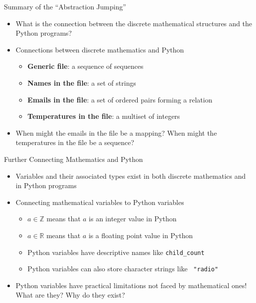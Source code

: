 \documentclass[14pt,aspectratio=169]{beamer}
\begin{document}
%
\begin{frame}{Summary of the ``Abstraction Jumping''}
  \begin{itemize}
    \item What is the connection between the discrete mathematical structures
      and the Python programs?
      \vspace*{-.15in}
    \item Connections between discrete mathematics and Python
      \begin{itemize}
        \item {\bf Generic file}: a sequence of sequences
        \item {\bf Names in the file}: a set of strings
        \item {\bf Emails in the file}: a set of ordered pairs forming a
          relation
        \item {\bf Temperatures in the file}: a multiset of integers
      \end{itemize}
      \vspace*{-.2in}
    \item When might the emails in the file be a mapping? When might the
      temperatures in the file be a sequence?
  \end{itemize}
\end{frame}

%
\begin{frame}{Further Connecting Mathematics and Python}
  \begin{itemize}
    \item Variables and their associated types exist in both discrete
      mathematics and in Python programs
      \vspace*{-.15in}
    \item Connecting mathematical variables to Python variables
      \begin{itemize}
        \item $a \in \mathbb{Z}$ means that $a$ is an integer value in Python
        \item $a \in \mathbb{R}$ means that $a$ is a floating point value in
          Python
        \item Python variables have descriptive names like {\tt child\_count}
        \item Python variables can also store character strings like {\tt
          "radio"}
      \end{itemize}
      \vspace*{-.2in}
    \item Python variables have practical limitations not faced by
      mathematical ones! What are they? Why do they exist?
  \end{itemize}
\end{frame}
\end{document}
